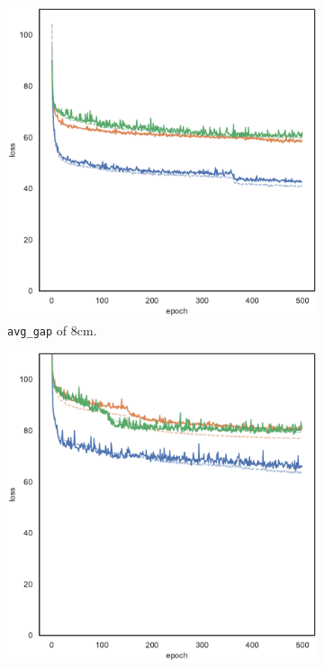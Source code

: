 \begin{figure}[!htb]
	\begin{center}
		\begin{subfigure}[h]{0.32\textwidth}
			\includegraphics[width=\textwidth]{contents/images/task1-comm-extension/loss-communication-gap_8@copy}%
			\caption{\texttt{avg\_gap} of $8$\gls{cm}.}
		\end{subfigure}
		\hfill
		\begin{subfigure}[h]{0.32\textwidth}
			\includegraphics[width=\textwidth]{contents/images/task1-comm-extension/loss-communication-gap_20@copy}%

\end{subfigure}
\end{center}
\end{figure}
